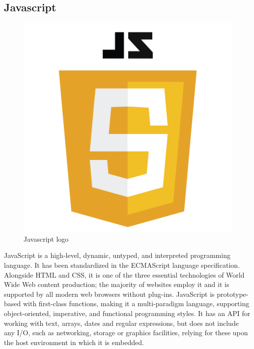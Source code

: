 \subsection{Javascript}
\begin{figure}[h]
\centering \includegraphics[scale=0.3]{input/images/JS.png}
\caption{Javascript logo}
\end{figure}
JavaScript is a high-level, dynamic, untyped, and interpreted programming language. It has been standardized in the ECMAScript language specification. Alongside HTML and CSS, it is one of the three essential technologies of World Wide Web content production; the majority of websites employ it and it is supported by all modern web browsers without plug-ins. JavaScript is prototype-based with first-class functions, making it a multi-paradigm language, supporting object-oriented, imperative, and functional programming styles. It has an API for working with text, arrays, dates and regular expressions, but does not include any I/O, such as networking, storage or graphics facilities, relying for these upon the host environment in which it is embedded.

